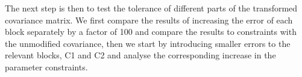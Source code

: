 \documentclass[twocolumn]{\docclass}
\newcommand{\rf}[1]{\ref{fig:#1}}
\begin{document}
	
	
	The next step is then to test the tolerance of different parts of the transformed covariance matrix. We first compare the results of increasing the error of each block separately by a factor of 100 and compare the results to constraints with the unmodified covariance, then we start by introducing smaller errors to the relevant blocks, C1 and C2 and analyse the corresponding increase in the parameter constraints.
	
	
	
\end{document}
